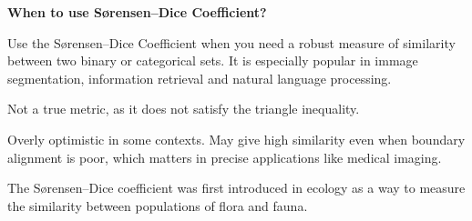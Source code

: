 \textbf{When to use S{\o}rensen–Dice Coefficient?}

Use the S{\o}rensen–Dice Coefficient when you need a robust measure of similarity between two binary
or categorical sets. It is especially popular in immage segmentation, information retrieval and
natural language processing.

{
\item Not a true metric, as it does not satisfy the triangle inequality.
\item Overly optimistic in some contexts. May give high similarity even when boundary alignment
is poor, which matters in precise applications like medical imaging.
}

\clearpage

\thispagestyle{customstyle}

{The S{\o}rensen–Dice coefficient was first introduced in ecology as a way to measure the similarity
between populations of flora and fauna.}

\vspace{-5pt}